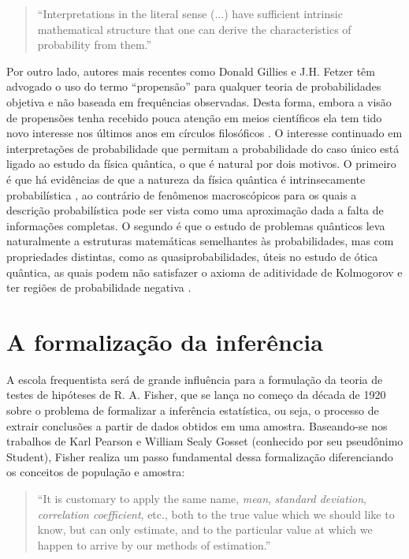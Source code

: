 \begin{quote}
``Interpretations in the literal sense (...) have sufficient intrinsic mathematical structure that one can derive
the characteristics of probability from them.''\citep{Milne93}
\end{quote}

Por outro lado, autores mais recentes como Donald Gillies e J.H. Fetzer têm advogado o uso do termo ``propensão'' para
qualquer teoria de probabilidades objetiva e não baseada em frequências observadas.
Desta forma, embora a visão de propensões tenha recebido pouca atenção em meios científicos
ela tem tido novo interesse nos últimos anos em círculos filosóficos \citep{Gillies2000}. 
O interesse continuado em interpretações de probabilidade que permitam a probabilidade do caso único
está ligado ao estudo da física quântica, o que é natural por dois motivos.
O primeiro é que há evidências de que a natureza da física quântica é intrinsecamente probabilística \citep{Gudder88}, 
ao contrário de fenômenos
macroscópicos para os quais a descrição probabilística pode ser vista como uma aproximação dada a falta de informações completas.
O segundo é que o estudo de problemas quânticos leva naturalmente a estruturas matemáticas semelhantes às probabilidades, mas
com propriedades distintas, como as quasiprobabilidades, úteis no estudo de ótica quântica, as quais podem não satisfazer o
axioma de aditividade de Kolmogorov e ter regiões de probabilidade
negativa \citep{Mandel95}.

\section{A formalização da inferência}\label{sec:infer}

A escola frequentista será de grande influência para a formulação da teoria de testes de hipóteses de R. A. Fisher, que se
lança no começo da década de 1920 sobre o problema de formalizar a inferência estatística, ou seja, o processo de
extrair conclusões a partir de dados obtidos em uma amostra. Baseando-se nos trabalhos de Karl Pearson e William Sealy Gosset
(conhecido por seu pseudônimo Student), Fisher realiza um passo fundamental dessa formalização
diferenciando os conceitos de população e amostra:

\begin{quote}
``It is customary to apply the same name, {\em mean}, {\em standard deviation}, {\em correlation coefficient}, etc., both 
to the true value which we should like to know, but can only estimate, and to the particular value at which we happen 
to arrive by our methods of estimation.''\citep{Fisher1922}
\end{quote}

